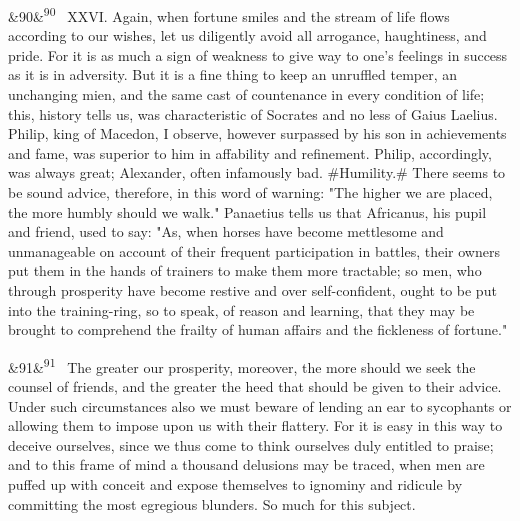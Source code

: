 \documentclass[12pt]{article}
\newcommand{\para}[1][]{\par\noindent\ifx&#1&\else\textsuperscript{\footnotesize #1}~\fi}
\begin{document}
\para[90] XXVI. Again, when fortune smiles and the stream of life flows according to our wishes, let us diligently avoid all arrogance, haughtiness, and pride. For it is as much a sign of weakness to give way to one's feelings in success as it is in adversity. But it is a fine thing to keep an unruffled temper, an unchanging mien, and the same cast of countenance in every condition of life; this, history tells us, was characteristic of Socrates and no less of Gaius Laelius. Philip, king of Macedon, I observe, however surpassed by his son in achievements and fame, was superior to him in affability and refinement. Philip, accordingly, was always great; Alexander, often infamously bad. \#Humility.\# There seems to be sound advice, therefore, in this word of warning: "The higher we are placed, the more humbly should we walk." Panaetius tells us that Africanus, his pupil and friend, used to say: "As, when horses have become mettlesome and unmanageable on account of their frequent participation in battles, their owners put them in the hands of trainers to make them more tractable; so men, who through prosperity have become restive and over self-confident, ought to be put into the training-ring, so to speak, of reason and learning, that they may be brought to comprehend the frailty of human affairs and the fickleness of fortune."

\para[91] The greater our prosperity, moreover, the more should we seek the counsel of friends, and the greater the heed that should be given to their advice. Under such circumstances also we must beware of lending an ear to sycophants or allowing them to impose upon us with their flattery. For it is easy in this way to deceive ourselves, since we thus come to think ourselves duly entitled to praise; and to this frame of mind a thousand delusions may be traced, when men are puffed up with conceit and expose themselves to ignominy and ridicule by committing the most egregious blunders. So much for this subject.
\end{document}
